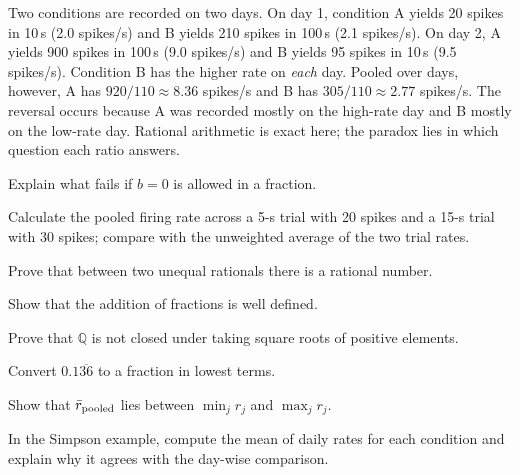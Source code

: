 \begin{workedexample}
Two conditions are recorded on two days. On day 1, condition A yields 20 spikes in 10\,s (2.0 spikes/s) and B yields 210 spikes in 100\,s (2.1 spikes/s). On day 2, A yields 900 spikes in 100\,s (9.0 spikes/s) and B yields 95 spikes in 10\,s (9.5 spikes/s). Condition B has the higher rate on \emph{each} day. Pooled over days, however, A has $920/110\approx8.36$ spikes/s and B has $305/110\approx2.77$ spikes/s. The reversal occurs because A was recorded mostly on the high-rate day and B mostly on the low-rate day. Rational arithmetic is exact here; the paradox lies in which question each ratio answers.
\end{workedexample}
\begin{exercises}
\item Explain what fails if $b=0$ is allowed in a fraction.
\item Calculate the pooled firing rate across a 5-s trial with 20 spikes and a 15-s trial with 30 spikes; compare with the unweighted average of the two trial rates.
\item Prove that between two unequal rationals there is a rational number.
\item Show that the addition of fractions is well defined.
\item Prove that $\mathbb Q$ is not closed under taking square roots of positive elements.
\item Convert $0.1\overline{36}$ to a fraction in lowest terms.
\item Show that $\bar r_{\rm pooled}$ lies between $\min_jr_j$ and $\max_jr_j$.
\item In the Simpson example, compute the mean of daily rates for each condition and explain why it agrees with the day-wise comparison.
\end{exercises}
